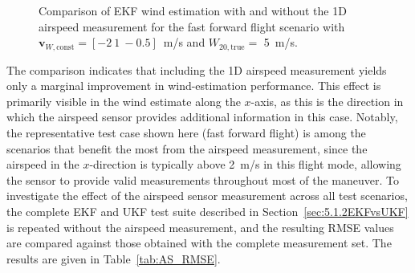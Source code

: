 \begin{figure}[htbp]
%
	\caption{Comparison of EKF wind estimation with and without the 1D airspeed measurement for the fast forward flight scenario with $\bm{v}_{W,\mathrm{const}} = [-2\ 1\ -0.5]$\SI{}{m/s} and $W_{20, \mathrm{true}} = $ \SI{5}{m/s}.}
	\label{fig:AS_Comparision}
\end{figure}

The comparison indicates that including the 1D airspeed measurement yields only a marginal improvement in wind-estimation performance. 
This effect is primarily visible in the wind estimate along the $x$-axis, as this is the direction in which the airspeed sensor provides additional information in this case. Notably, the representative test case shown here (fast forward flight) is among the scenarios that benefit the most from the airspeed measurement, since the airspeed in the $x$-direction is typically above \SI{2}{m/s} in this flight mode, allowing the sensor to provide valid measurements throughout most of the maneuver. 
To investigate the effect of the airspeed sensor measurement across all test scenarios, the complete EKF and UKF test suite described in Section~\ref{sec:5.1.2EKFvsUKF} is repeated without the airspeed measurement, and the resulting RMSE values are compared against those obtained with the complete measurement set. The results are given in Table~\ref{tab:AS_RMSE}.

